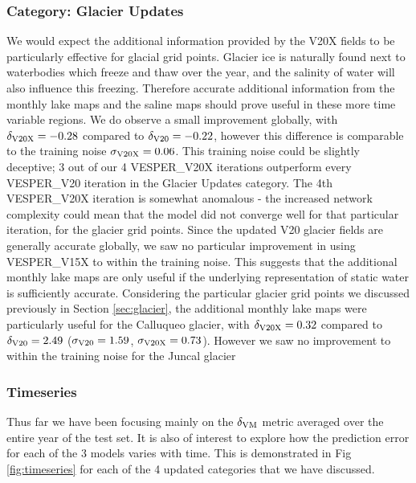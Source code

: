 \documentclass[hess, twostagejnl]{copernicus}
\begin{document}
\subsubsection{Category: Glacier Updates}
We would expect the additional information provided by the V20X fields to be particularly effective for glacial grid points. Glacier ice is naturally found next to waterbodies which freeze and thaw over the year, and the salinity of water will also influence this freezing. Therefore accurate additional information from the monthly lake maps and the saline maps should prove useful in these more time variable regions. We do observe a small improvement globally, with $\delta_{\rm V20X} = -0.28$ compared to $\delta_{\rm V20} = -0.22$, however this difference is comparable to the training noise $\sigma_{\rm V20X} = 0.06$. This training noise could be slightly deceptive;  3 out of our 4 VESPER\_V20X iterations outperform every VESPER\_V20 iteration in the Glacier Updates category. The 4th VESPER\_V20X iteration is somewhat anomalous - the increased network complexity could mean that the model did not converge well for that particular iteration, for the glacier grid points. Since the updated V20 glacier fields are generally accurate globally, we saw no particular  improvement in using VESPER\_V15X to within the training noise. This suggests that the additional monthly lake maps are only useful if the underlying representation of static water is sufficiently accurate. Considering the particular glacier grid points we discussed previously in Section \ref{sec:glacier}, the additional monthly lake maps were particularly useful for the Calluqueo glacier, with $\delta_{\rm V20X} = 0.32$ compared to $\delta_{\rm V20} = 2.49$ ($\sigma_{\rm V20}=1.59$, $\sigma_{\rm V20X}=0.73$). However we saw no improvement to within the training noise for the Juncal glacier 

\subsubsection{Timeseries}
Thus far we have been focusing mainly on the $\delta_{\rm VM}$ metric averaged over the entire year of the test set. It is also of interest to explore how the prediction error for each of the 3 models varies with time. This is demonstrated in Fig \ref{fig:timeseries} for each of the 4 updated categories that we have discussed. \newline 
\end{document}
